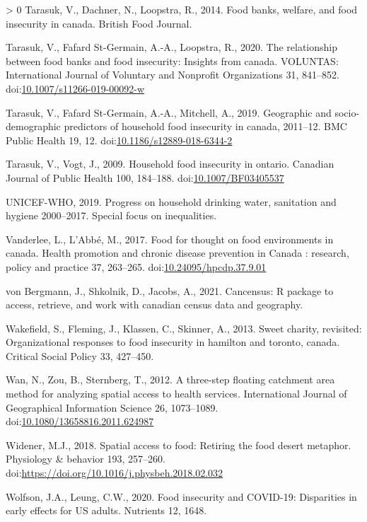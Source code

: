 \documentclass[]{elsarticle} %
\newlength{\cslhangindent}
\newenvironment{CSLReferences}[3] %
 {%
  \setlength{\parindent}{0pt}
  \ifodd #1 \everypar{\setlength{\hangindent}{\cslhangindent}}\ignorespaces\fi
  \ifnum #2 > 0
  \setlength{\parskip}{#2\baselineskip}
  \fi
 }%
 {}
\begin{document}
\begin{CSLReferences}{1}{0}
\leavevmode\hypertarget{ref-tarasuk2014food}{}%
Tarasuk, V., Dachner, N., Loopstra, R., 2014. Food banks, welfare, and
food insecurity in canada. British Food Journal.

\leavevmode\hypertarget{ref-tarasuk2020relationship}{}%
Tarasuk, V., Fafard St-Germain, A.-A., Loopstra, R., 2020. The
relationship between food banks and food insecurity: Insights from
canada. VOLUNTAS: International Journal of Voluntary and Nonprofit
Organizations 31, 841--852.
doi:\href{https://doi.org/10.1007/s11266-019-00092-w}{10.1007/s11266-019-00092-w}

\leavevmode\hypertarget{ref-tarasuk2019geographic}{}%
Tarasuk, V., Fafard St-Germain, A.-A., Mitchell, A., 2019. Geographic
and socio-demographic predictors of household food insecurity in canada,
2011--12. BMC Public Health 19, 12.
doi:\href{https://doi.org/10.1186/s12889-018-6344-2}{10.1186/s12889-018-6344-2}

\leavevmode\hypertarget{ref-tarasuk2009household}{}%
Tarasuk, V., Vogt, J., 2009. Household food insecurity in ontario.
Canadian Journal of Public Health 100, 184--188.
doi:\href{https://doi.org/10.1007/BF03405537}{10.1007/BF03405537}

\leavevmode\hypertarget{ref-world2019progress}{}%
UNICEF-WHO, 2019. Progress on household drinking water, sanitation and
hygiene 2000--2017. Special focus on inequalities.

\leavevmode\hypertarget{ref-vanderlee2017food}{}%
Vanderlee, L., L'Abbé, M., 2017. Food for thought on food environments
in canada. Health promotion and chronic disease prevention in Canada :
research, policy and practice 37, 263--265.
doi:\href{https://doi.org/10.24095/hpcdp.37.9.01}{10.24095/hpcdp.37.9.01}

\leavevmode\hypertarget{ref-vonBergmann2021cancensus}{}%
von Bergmann, J., Shkolnik, D., Jacobs, A., 2021. Cancensus: R package
to access, retrieve, and work with canadian census data and geography.

\leavevmode\hypertarget{ref-wakefield2013sweet}{}%
Wakefield, S., Fleming, J., Klassen, C., Skinner, A., 2013. Sweet
charity, revisited: Organizational responses to food insecurity in
hamilton and toronto, canada. Critical Social Policy 33, 427--450.

\leavevmode\hypertarget{ref-wan2012three}{}%
Wan, N., Zou, B., Sternberg, T., 2012. A three-step floating catchment
area method for analyzing spatial access to health services.
International Journal of Geographical Information Science 26,
1073--1089.
doi:\href{https://doi.org/10.1080/13658816.2011.624987}{10.1080/13658816.2011.624987}

\leavevmode\hypertarget{ref-widener2018spatial}{}%
Widener, M.J., 2018. Spatial access to food: Retiring the food desert
metaphor. Physiology \& behavior 193, 257--260.
doi:\url{https://doi.org/10.1016/j.physbeh.2018.02.032}

\leavevmode\hypertarget{ref-wolfson2020food}{}%
Wolfson, J.A., Leung, C.W., 2020. Food insecurity and COVID-19:
Disparities in early effects for US adults. Nutrients 12, 1648.

\end{CSLReferences}
\end{document}
